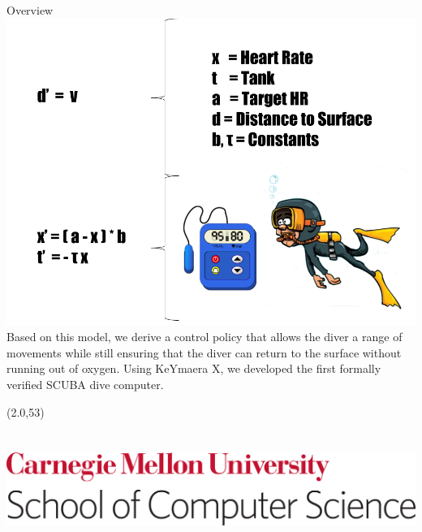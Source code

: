 \documentclass[final]{beamer}
\theoremstyle{definition}
\begin{document}
\begin{frame}[fragile]
\begin{textblock}{27}
\begin{block}{Overview}
\includegraphics[width = 26cm,scale=.75]{images/SCUBA.png}\\
Based on this model, we derive a control policy that allows the diver a range of movements while still ensuring that the diver can return to the surface without running out of oxygen. Using KeYmaera X, we developed the first formally verified SCUBA dive computer.
\end{block}
\end{textblock}




\begin{textblock}{23}(2.0,53)
\includegraphics[height=4.5cm,width=25.365cm]{images/SCS_Unitmark_187_K_CMYK.png}
\end{textblock}



\end{frame}
\end{document}
